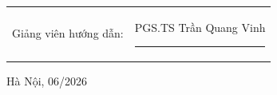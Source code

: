 \documentclass[DoAn.tex]{subfiles}
\begin{document}
\begin{titlepage}
\begin{center}
\begin{table}[H]
    \centering
    \begin{tabular}{l l}
        \fontsize{14pt}{0pt}\selectfont Giảng viên hướng dẫn: & \fontsize{14pt}{0pt}\selectfont PGS.TS Trần Quang Vinh \hspace{0.7cm} \rule{3cm}{0.1mm} \\[0.45cm]
    \end{tabular}
\end{table}


\fontsize{14pt}{0pt}\selectfont Hà Nội, 06/2026
\end{center}
\end{titlepage}
\end{document}
